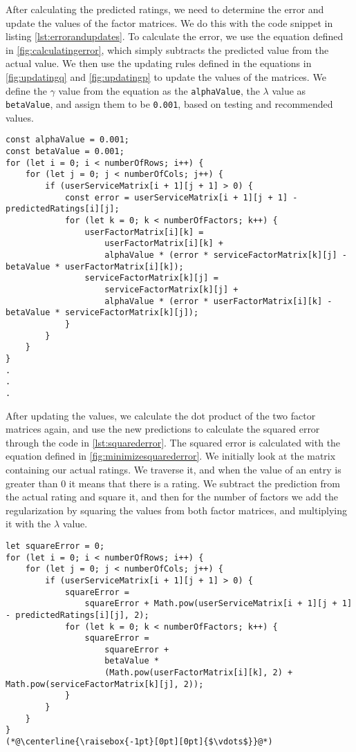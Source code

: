 After calculating the predicted ratings, we need to determine the error and update the values of the factor matrices.
We do this with the code snippet in listing \autoref{lst:errorandupdates}.
To calculate the error, we use the equation defined in \autoref{fig:calculatingerror}, which simply subtracts the predicted value from the actual value.
We then use the updating rules defined in the equations in \autoref{fig:updatingq} and \autoref{fig:updatingp} to update the values of the matrices.
We define the $\gamma$ value from the equation as the \texttt{alphaValue}, the $\lambda$ value as \texttt{betaValue}, and assign them to be \texttt{0.001}, based on testing and recommended values.

\begin{lstlisting}[caption={Calculating error and updating values}, captionpos=b, label={lst:errorandupdates}]
const alphaValue = 0.001;
const betaValue = 0.001;
for (let i = 0; i < numberOfRows; i++) {
    for (let j = 0; j < numberOfCols; j++) {
        if (userServiceMatrix[i + 1][j + 1] > 0) {
            const error = userServiceMatrix[i + 1][j + 1] - predictedRatings[i][j];
            for (let k = 0; k < numberOfFactors; k++) {
                userFactorMatrix[i][k] =
                    userFactorMatrix[i][k] +
                    alphaValue * (error * serviceFactorMatrix[k][j] - betaValue * userFactorMatrix[i][k]);
                serviceFactorMatrix[k][j] =
                    serviceFactorMatrix[k][j] +
                    alphaValue * (error * userFactorMatrix[i][k] - betaValue * serviceFactorMatrix[k][j]);
            }
        }
    }
}
.
.
.
\end{lstlisting}
After updating the values, we calculate the dot product of the two factor matrices again, and use the new predictions to calculate the squared error through the code in \autoref{lst:squarederror}.
The squared error is calculated with the equation defined in \autoref{fig:minimizesquarederror}.
We initially look at the matrix containing our actual ratings.
We traverse it, and when the value of an entry is greater than 0 it means that there is a rating.
We subtract the prediction from the actual rating and square it, and then for the number of factors we add the regularization by squaring the values from both factor matrices, and multiplying it with the $\lambda$ value.
\begin{lstlisting}[caption={Calculating the overall squared error}, captionpos=b, label={lst:squarederror}]
let squareError = 0;
for (let i = 0; i < numberOfRows; i++) {
    for (let j = 0; j < numberOfCols; j++) {
        if (userServiceMatrix[i + 1][j + 1] > 0) {
            squareError =
                squareError + Math.pow(userServiceMatrix[i + 1][j + 1] - predictedRatings[i][j], 2);
            for (let k = 0; k < numberOfFactors; k++) {
                squareError =
                    squareError +
                    betaValue *
                    (Math.pow(userFactorMatrix[i][k], 2) + Math.pow(serviceFactorMatrix[k][j], 2));
            }
        }
    }
}
(*@\centerline{\raisebox{-1pt}[0pt][0pt]{$\vdots$}}@*)
\end{lstlisting}
